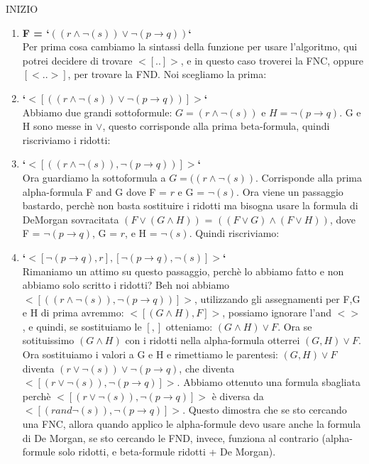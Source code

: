 \documentclass[11pt]{article}
\begin{document}
INIZIO\
\begin{enumerate}
\item \textbf{F = `$((r \land \lnot(s)) \lor \lnot(p \rightarrow q))$`}\\
Per prima cosa cambiamo la sintassi della funzione per usare l'algoritmo, qui potrei decidere di trovare $<[..]>$, e in questo caso troverei la FNC, oppure $[<..>]$, per trovare la FND. Noi scegliamo la prima:\\
\item \textbf{`$<[((r \land \lnot(s)) \lor \lnot(p \rightarrow q))]>$`}\\
Abbiamo due grandi sottoformule: $G = (r \land \neg(s))$ e $H = \neg(p \rightarrow q)$. G e H sono messe in $\lor$, questo corrisponde alla prima beta-formula, quindi riscriviamo i ridotti:\\
\item \textbf{`$<[((r \land \lnot(s)) , \lnot(p \rightarrow q))]>$`}\\
Ora guardiamo la sottoformula a $G = ((r \land \lnot(s))$. Corrisponde alla prima alpha-formula F and G dove F = $r$ e G = $\lnot(s)$. Ora viene un passaggio bastardo, perchè non basta sostituire i ridotti ma bisogna usare la formula di DeMorgan sovracitata $(F \lor (G \land H))$ = $((F \lor G) \land (F \lor H))$, dove F = $\lnot(p \rightarrow q)$, G = $r$, e H = $\lnot(s)$. Quindi riscriviamo:\\
\item \textbf{`$<[\lnot(p \rightarrow q),r],[\lnot(p \rightarrow q),\lnot(s)]>$`}\\
Rimaniamo un attimo su questo passaggio, perchè lo abbiamo fatto e non abbiamo solo scritto i ridotti? Beh noi abbiamo $<[((r \land \lnot(s)) , \lnot(p \rightarrow q))]>$, utilizzando gli assegnamenti per F,G e H di prima avremmo: $<[(G \land H) , F]>$, possiamo ignorare l'and $<>$, e quindi, se sostituiamo le $[,]$ otteniamo: $(G \land H) \lor F$. Ora se sotituissimo $(G \land H)$ con i ridotti nella alpha-formula otterrei $(G, H) \lor F$. Ora sostituiamo i valori a G e H e rimettiamo le parentesi: $(G, H) \lor F$ diventa $(r \lor \lnot(s)) \lor \lnot(p \rightarrow q)$, che diventa $<[(r \lor \lnot(s)) , \lnot(p \rightarrow q)]>$. Abbiamo ottenuto una formula sbagliata perchè $<[(r \lor \lnot(s)) , \lnot(p \rightarrow q)]>$ è diversa da $<[(r and \lnot(s)) , \lnot(p \rightarrow q)]>$. Questo dimostra che se sto cercando una FNC, allora quando applico le alpha-formule devo usare anche la formula di De Morgan, se sto cercando le FND, invece, funziona al contrario (alpha-formule solo ridotti, e beta-formule ridotti + De Morgan).\\

\end{enumerate}
\end{document}
